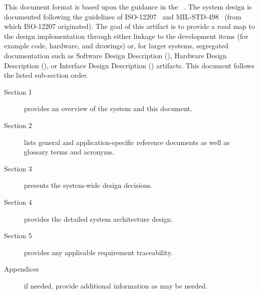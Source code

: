 This document format is based upon the guidance in the \SSDD{} \DID~\cite{ref__SSDD_DID}.
The system design is documented following the guidelines of ISO-12207~\cite{ref__ISO_12207} and MIL-STD-498~\cite{ref__MIL_STD_498} (from which ISO-12207 originated).
The goal of this artifact is to provide a road map to the design implementation through either linkage to the development items (for example code, hardware, and \CAD drawings) or, for larger systems, segregated documentation such as Software Design Description (\SDD), Hardware Design Description (\HWDD), or Interface Design Description (\IDD) artifacts.
This document follows the listed \SSDD sub-section order.
\begin{description}
	\item[Section 1] provides an overview of the system and this document.
	\item[Section 2] lists general and application-specific reference documents as well as glossary terms and acronyms. 
	\item[Section 3] presents the system-wide design decisions.
	\item[Section 4] provides the detailed system architecture design. 
	\item[Section 5] provides any applicable requirement traceability.
	\item[Appendices] if needed, provide additional information as may be needed.
\end{description}